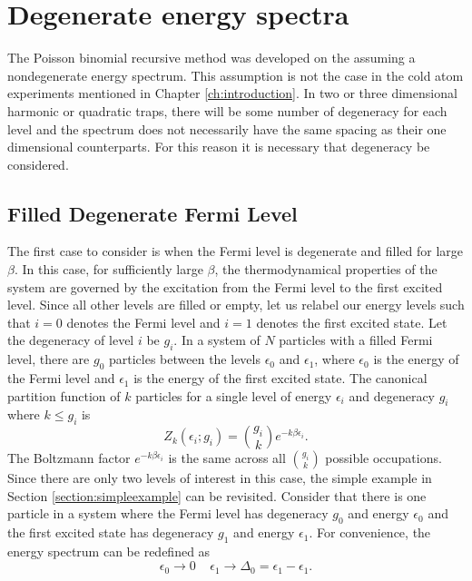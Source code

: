 \section{Degenerate energy spectra}\label{section:degenerate}
The Poisson binomial recursive method was developed on the assuming a nondegenerate energy spectrum. This assumption is not the case in the cold atom experiments mentioned in Chapter \ref{ch:introduction}. In two or three dimensional harmonic or quadratic traps, there will be some number of degeneracy for each level and the spectrum does not necessarily have the same spacing as their one dimensional counterparts. For this reason it is necessary that degeneracy be considered. 


\subsection{Filled Degenerate Fermi Level}\label{section:filleddegen}
The first case to consider is when the Fermi level is degenerate and filled for large $\beta$. In this case, for sufficiently large $\beta$, the thermodynamical properties of the  system are governed by the excitation from the Fermi level to the first excited level. Since all other levels are filled or empty, let us relabel our energy levels such that $i=0$ denotes the Fermi level and $i=1$ denotes the first excited state. Let the degeneracy of level $i$ be $g_i$. In a system of $N$ particles with a filled Fermi level, there are $g_0$ particles between the levels $\epsilon_0$ and $\epsilon_1$, where $\epsilon_0$ is the energy of the Fermi level and $\epsilon_1$ is the energy of the first excited state. The canonical partition function of $k$ particles for a single level of energy $\epsilon_i$ and degeneracy $g_i$ where $k\leq g_i$ is 
\begin{equation}
    Z_k(\epsilon_i;g_i)={g_i \choose k} e^{-k\beta\epsilon_i}.
    \label{eq:ZNsinglelevel}
\end{equation}
The Boltzmann factor $e^{-k\beta\epsilon_i}$ is the same across all ${g_i \choose k}$ possible occupations. Since there are only two levels of interest in this case, the simple example in Section \ref{section:simpleexample} can be revisited. Consider that there is one particle in a system where the Fermi level has degeneracy $g_0$ and energy $\epsilon_0$ and the first excited state has degeneracy $g_1$ and energy $\epsilon_1$. For convenience, the energy spectrum can be redefined as
\begin{equation}
    \epsilon_0 \xrightarrow[]{} 0\ \ \ \ \ \epsilon_1\xrightarrow[]{}\Delta_0=\epsilon_1-\epsilon_1.\nonumber
\end{equation}
